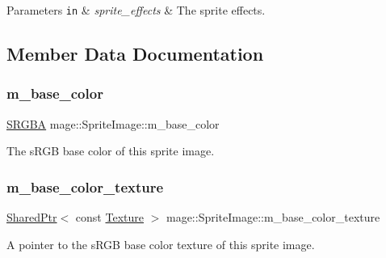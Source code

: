 \begin{DoxyParams}[1]{Parameters}
\mbox{\tt in}  & {\em sprite\+\_\+effects} & The sprite effects. \\
\hline
\end{DoxyParams}


\subsection{Member Data Documentation}
\hypertarget{classmage_1_1_sprite_image_aa83cc38aa8a84e8fc434232b4223c236}{}\label{classmage_1_1_sprite_image_aa83cc38aa8a84e8fc434232b4223c236} 
\subsubsection{\texorpdfstring{m\+\_\+base\+\_\+color}{m\_base\_color}}
{\footnotesize\ttfamily \hyperlink{structmage_1_1_s_r_g_b_a}{S\+R\+G\+BA} mage\+::\+Sprite\+Image\+::m\+\_\+base\+\_\+color\hspace{0.3cm}{\ttfamily [private]}}

The s\+R\+GB base color of this sprite image. \hypertarget{classmage_1_1_sprite_image_a92f5b052561ca7d8fb317b8479d820a2}{}\label{classmage_1_1_sprite_image_a92f5b052561ca7d8fb317b8479d820a2} 
\subsubsection{\texorpdfstring{m\+\_\+base\+\_\+color\+\_\+texture}{m\_base\_color\_texture}}
{\footnotesize\ttfamily \hyperlink{namespacemage_a1e01ae66713838a7a67d30e44c67703e}{Shared\+Ptr}$<$ const \hyperlink{classmage_1_1_texture}{Texture} $>$ mage\+::\+Sprite\+Image\+::m\+\_\+base\+\_\+color\+\_\+texture\hspace{0.3cm}{\ttfamily [private]}}

A pointer to the s\+R\+GB base color texture of this sprite image. \hypertarget{classmage_1_1_sprite_image_a27540b0bee5970d2e978270fe20017ab}{}\label{classmage_1_1_sprite_image_a27540b0bee5970d2e978270fe20017ab} 
